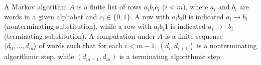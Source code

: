 A Markov algorithm $A$ is a finite list of rows $a_i b_i c_i$ ($i < m$), where $a_i$ and $b_i$ are words in a given alphabet and $c_i \in \{0, 1\}$. A row with $a_i b_i 0$ is indicated $a_i \rightarrow b_i$ (nonterminating substitution), while a row with $a_i b_i 1$ is indicated $a_i \rightarrow \cdot\ b_i$ (terminating substitution). A computation under $A$ is a finite sequence $\langle d_0, \ldots, d_m \rangle$ of words such that for each $i < m - 1$, $(d_i, d_{i+1})$ is a nonterminating algorithmic step, while $(d_{m-1}, d_m)$ is a terminating algorithmic step.
